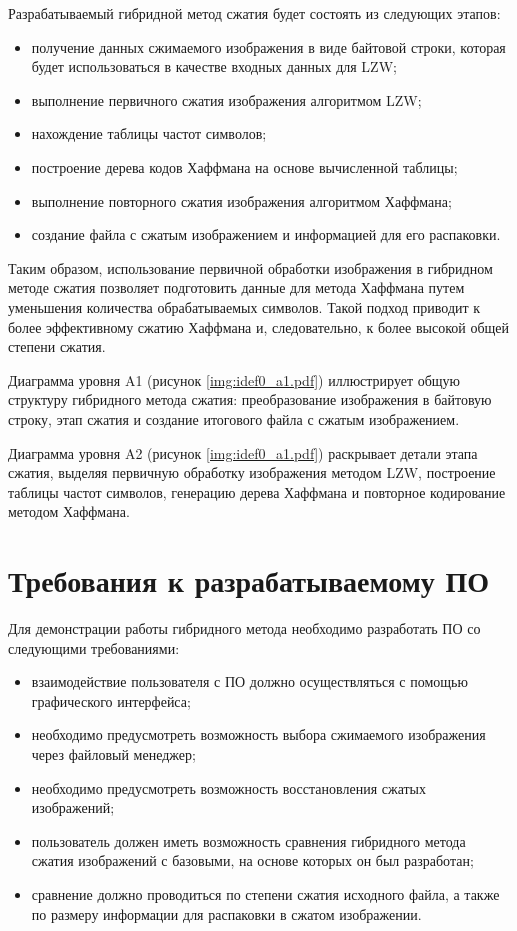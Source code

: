 \clearpage
Разрабатываемый гибридной метод сжатия будет состоять из следующих этапов:
\begin{itemize}
    \item получение данных сжимаемого изображения в виде байтовой строки, которая будет использоваться в качестве входных данных для LZW;
    \item выполнение первичного сжатия изображения алгоритмом LZW;
    \item нахождение таблицы частот символов;
    \item построение дерева кодов Хаффмана на основе вычисленной таблицы;
    \item выполнение повторного сжатия изображения алгоритмом Хаффмана;
    \item создание файла с сжатым изображением и информацией для его распаковки.
\end{itemize}

Таким образом, использование первичной обработки изображения в гибридном методе сжатия позволяет подготовить данные для метода Хаффмана путем уменьшения количества обрабатываемых символов. Такой подход приводит к более эффективному сжатию Хаффмана и, следовательно, к более высокой общей степени сжатия.

Диаграмма уровня A1 (рисунок \ref{img:idef0_a1.pdf}) иллюстрирует общую структуру гибридного метода сжатия: преобразование изображения в байтовую строку, этап сжатия и создание итогового файла с сжатым изображением.

Диаграмма уровня A2 (рисунок \ref{img:idef0_a1.pdf}) раскрывает детали этапа сжатия, выделяя первичную обработку изображения методом LZW, построение таблицы частот символов, генерацию дерева Хаффмана и повторное кодирование методом Хаффмана.

\section{Требования к разрабатываемому ПО}

Для демонстрации работы гибридного метода необходимо разработать ПО со следующими требованиями:
\begin{itemize}
    \item взаимодействие пользователя с ПО должно осуществляться с помощью графического интерфейса;
    \item необходимо предусмотреть возможность выбора сжимаемого изображения через файловый менеджер;
    \item необходимо предусмотреть возможность восстановления сжатых изображений;
    \item пользователь должен иметь возможность сравнения гибридного метода сжатия изображений с базовыми, на основе которых он был разработан;
    \item сравнение должно проводиться по степени сжатия исходного файла, а также по размеру информации для распаковки в сжатом изображении.
\end{itemize}

